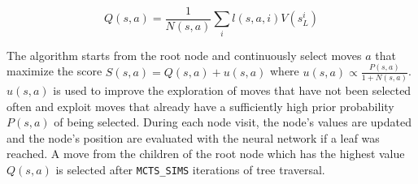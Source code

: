 \begin{equation} \label{eq:qsa}
    Q(s, a) = \frac{1}{N(s,a)} \sum_i l(s, a, i) V(s^i_L) 
\end{equation}

The algorithm starts from the root node and continuously select moves $a$ that maximize the score $S(s, a) = Q(s, a) + u(s, a)$ where $u(s, a) \propto \frac{P(s,a)}{1+N(s,a)}$. $u(s, a)$ is used to improve the exploration of moves that have not been selected often and exploit moves that already have a sufficiently high prior probability $P(s, a)$ of being selected. During each node visit, the node's values are updated and the node's position are evaluated with the neural network if a leaf was reached. A move from the children of the root node which has the highest value $Q(s, a)$ is selected after \verb!MCTS_SIMS! iterations of tree traversal.

